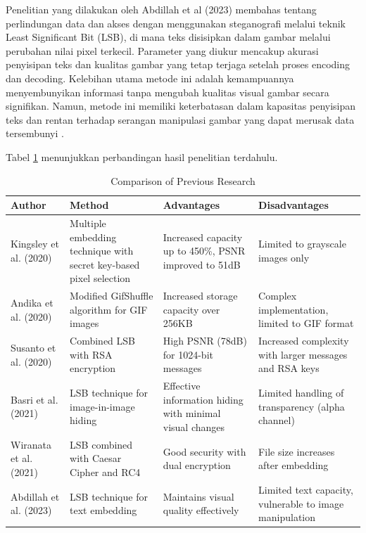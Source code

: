 \documentclass{ittelkom}
\begin{document}
{    Penelitian yang dilakukan oleh Abdillah et al (2023) membahas tentang
    perlindungan data dan akses dengan menggunakan steganografi melalui teknik
    Least Significant Bit (LSB), di mana teks disisipkan dalam gambar melalui
    perubahan nilai pixel terkecil. Parameter yang diukur mencakup akurasi
    penyisipan teks dan kualitas gambar yang tetap terjaga setelah proses encoding
    dan decoding. Kelebihan utama metode ini adalah kemampuannya menyembunyikan
    informasi tanpa mengubah kualitas visual gambar secara signifikan. Namun,
    metode ini memiliki keterbatasan dalam kapasitas penyisipan teks dan rentan
    terhadap serangan manipulasi gambar yang dapat merusak data tersembunyi
    \cite{abdillah2023implementasi}.

    Tabel \ref{tab:comparison} menunjukkan perbandingan hasil penelitian terdahulu.

    \begin{table}[h!]
        \caption{Comparison of Previous Research}
        \begin{tabularx}{\textwidth}{|p{2cm}|X|p{2.5cm}|p{2.5cm}|}
            \hline
            \textbf{Author}        & \textbf{Method}                                                    & \textbf{Advantages}                                      & \textbf{Disadvantages}                                  \\
            \hline
            Kingsley et al. (2020) & Multiple embedding technique with secret key-based pixel selection & Increased capacity up to 450\%, PSNR improved to 51dB    & Limited to grayscale images only                        \\
            \hline
            Andika et al. (2020)   & Modified GifShuffle algorithm for GIF images                       & Increased storage capacity over 256KB                    & Complex implementation, limited to GIF format           \\
            \hline
            Susanto et al. (2020)  & Combined LSB with RSA encryption                                   & High PSNR (78dB) for 1024-bit messages                   & Increased complexity with larger messages and RSA keys  \\
            \hline
            Basri et al. (2021)    & LSB technique for image-in-image hiding                            & Effective information hiding with minimal visual changes & Limited handling of transparency (alpha channel)        \\
            \hline
            Wiranata et al. (2021) & LSB combined with Caesar Cipher and RC4                            & Good security with dual encryption                       & File size increases after embedding                     \\
            \hline
            Abdillah et al. (2023) & LSB technique for text embedding                                   & Maintains visual quality effectively                     & Limited text capacity, vulnerable to image manipulation \\
            \hline
        \end{tabularx}
        \label{tab:comparison}
    \end{table}

}
\end{document}
